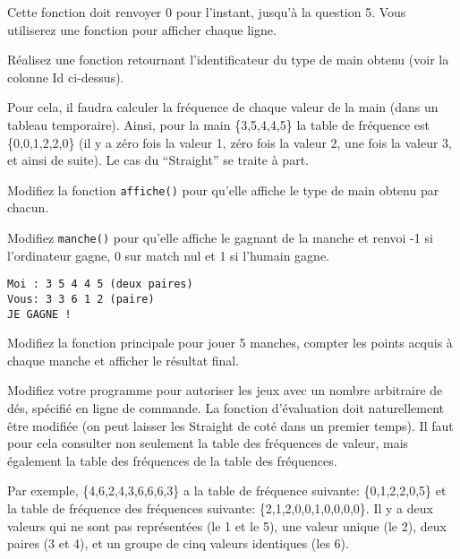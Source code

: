 \documentclass[10pt]{article}\usepackage[nu]{esial}
\begin{document}
\begin{Exercice}
  Cette fonction doit renvoyer 0 pour l'instant, jusqu'à la question
  5.  Vous utiliserez une fonction  pour afficher chaque ligne.

  \Question Réalisez une fonction  retournant
  l'identificateur du type de main obtenu (voir la colonne Id ci-dessus).

  Pour cela, il faudra calculer la fréquence de chaque valeur de la main (dans
  un tableau temporaire). Ainsi, pour la main \{3,5,4,4,5\} la table de
  fréquence est \{0,0,1,2,2,0\} (il y a zéro fois la valeur 1, zéro fois la
  valeur 2, une fois la valeur 3, et ainsi de suite). Le cas du ``Straight'' se
  traite à part.

  \Question Modifiez la fonction \texttt{affiche()} pour qu'elle affiche le
  type de main obtenu par chacun.

  \noindent\begin{minipage}{.62\linewidth}

    \Question Modifiez \texttt{manche()} pour qu'elle affiche le gagnant de la
    manche et renvoi -1 si l'ordinateur gagne, 0 sur match nul et 1 si l'humain
    gagne. 

  \end{minipage}\hfill\begin{minipage}{.35\linewidth}
    \begin{Verbatim}
Moi : 3 5 4 4 5 (deux paires)
Vous: 3 3 6 1 2 (paire)
JE GAGNE !
    \end{Verbatim}
  \end{minipage}

  \Question Modifiez la fonction principale pour jouer 5 manches, compter
  les points acquis à chaque manche et afficher le résultat final.

  \Question Modifiez votre programme pour autoriser les jeux avec un nombre
  arbitraire de dés, spécifié en ligne de commande. La fonction d'évaluation
  doit naturellement être modifiée (on peut laisser les Straight de coté dans
  un premier temps).  Il faut pour cela consulter non seulement la table des
  fréquences de valeur, mais également la table des fréquences de la table des
  fréquences. 

  Par exemple, \{4,6,2,4,3,6,6,6,3\} a la table de fréquence suivante:
  \{0,1,2,2,0,5\} et la table de fréquence des fréquences suivante:
  \{2,1,2,0,0,1,0,0,0,0\}. Il y a deux valeurs qui ne sont pas représentées 
  (le 1 et le 5), une valeur unique (le 2), deux paires (3 et 4), et
  un groupe de cinq valeurs identiques (les 6). 



\end{Exercice}
\end{document}
